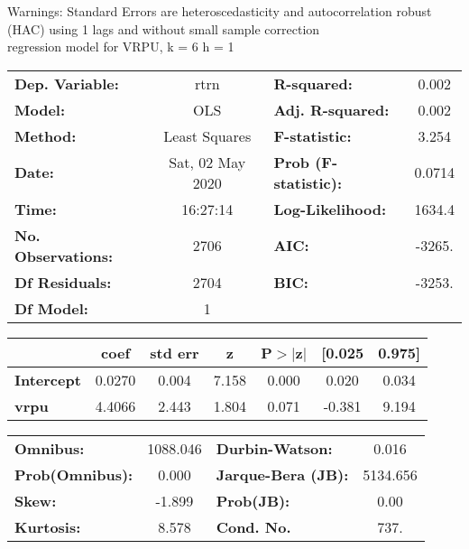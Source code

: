 Warnings: \newline
 [1] Standard Errors are heteroscedasticity and autocorrelation robust (HAC) using 1 lags and without small sample correction\\ 

regression model for VRPU, k = 6 h = 1\begin{center}
\begin{tabular}{lclc}
\toprule
\textbf{Dep. Variable:}    &       rtrn       & \textbf{  R-squared:         } &     0.002   \\
\textbf{Model:}            &       OLS        & \textbf{  Adj. R-squared:    } &     0.002   \\
\textbf{Method:}           &  Least Squares   & \textbf{  F-statistic:       } &     3.254   \\
\textbf{Date:}             & Sat, 02 May 2020 & \textbf{  Prob (F-statistic):} &   0.0714    \\
\textbf{Time:}             &     16:27:14     & \textbf{  Log-Likelihood:    } &    1634.4   \\
\textbf{No. Observations:} &        2706      & \textbf{  AIC:               } &    -3265.   \\
\textbf{Df Residuals:}     &        2704      & \textbf{  BIC:               } &    -3253.   \\
\textbf{Df Model:}         &           1      & \textbf{                     } &             \\
\bottomrule
\end{tabular}
\begin{tabular}{lcccccc}
                   & \textbf{coef} & \textbf{std err} & \textbf{z} & \textbf{P$> |$z$|$} & \textbf{[0.025} & \textbf{0.975]}  \\
\midrule
\textbf{Intercept} &       0.0270  &        0.004     &     7.158  &         0.000        &        0.020    &        0.034     \\
\textbf{vrpu}      &       4.4066  &        2.443     &     1.804  &         0.071        &       -0.381    &        9.194     \\
\bottomrule
\end{tabular}
\begin{tabular}{lclc}
\textbf{Omnibus:}       & 1088.046 & \textbf{  Durbin-Watson:     } &    0.016  \\
\textbf{Prob(Omnibus):} &   0.000  & \textbf{  Jarque-Bera (JB):  } & 5134.656  \\
\textbf{Skew:}          &  -1.899  & \textbf{  Prob(JB):          } &     0.00  \\
\textbf{Kurtosis:}      &   8.578  & \textbf{  Cond. No.          } &     737.  \\
\bottomrule
\end{tabular}
\end{center}

